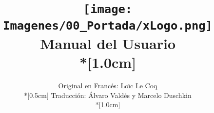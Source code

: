 \documentclass[twoside,spanish,a4paper,12pt]{report}
\title{\vspace{-1cm}
       \texttt{[image: Imagenes/00\_Portada/xLogo.png]}\\
       \Huge Manual del Usuario\\*[1.0cm]}
\author{\Large Original en Franc\'es: Lo\"ic Le Coq\\*[0.5cm]
        \Large Traducci\'on: \'Alvaro Vald\'es y Marcelo Duschkin\\*[1.0cm]}
\date{\texttt{http://xlogo.tuxfamily.org} %
\begin{center}
   \texttt{[image: Imagenes/00\_Portada/Portada\_es\_091.png]}
\end{center}
}
\begin{document}
\maketitle

\tableofcontents































\printindex{}
\end{document}
